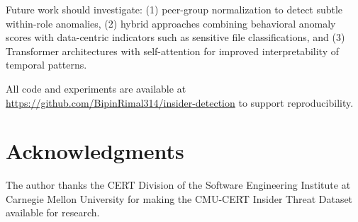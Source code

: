\documentclass[conference]{IEEEtran}
\begin{document}
Future work should investigate: (1) peer-group normalization to detect subtle within-role anomalies, (2) hybrid approaches combining behavioral anomaly scores with data-centric indicators such as sensitive file classifications, and (3) Transformer architectures with self-attention for improved interpretability of temporal patterns.

All code and experiments are available at \url{https://github.com/BipinRimal314/insider-detection} to support reproducibility.

\section*{Acknowledgments}

The author thanks the CERT Division of the Software Engineering Institute at Carnegie Mellon University for making the CMU-CERT Insider Threat Dataset available for research.



\end{document}
